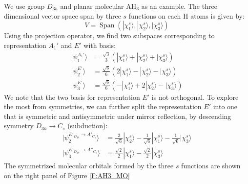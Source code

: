 \documentclass{article}
\DeclareMathOperator{\spn}{Span}
\begin{document}
We use group $D_{3h}$ and planar molecular AH$_3$ as an example. The 
three dimensional vector space span by three $s$ functions on each H atoms
is given by:
\begin{equation}
    V = \spn(|\chi^s_{1}\rangle, |\chi^s_2\rangle, |\chi^s_3\rangle)
\end{equation}
Using the projection operator, we find two subspaces corresponding to representation $A_1'$ 
and $E'$ with basis:
\begin{align}
    | \psi_1^{A_1'} \rangle &= \frac{\sqrt{3}}{3} (|\chi^s_1\rangle + |\chi^s_2\rangle + |\chi^s_3\rangle) \\
    |\psi_2^{E'}\rangle   &= \frac{\sqrt{6}}{6}( 2|\chi^s_1\rangle - |\chi^s_2\rangle - |\chi^s_3\rangle) \\
    |\psi_3^{E'}\rangle   &= \frac{\sqrt{6}}{6}(- |\chi^s_1\rangle + 2|\chi^s_2\rangle - |\chi^s_3\rangle)
\end{align}
We note that the two basis for representation $E'$ is not orthogonal.
To explore the most from symmetries, we can further split the representation $E'$ into one
that is symmetric and antisymmetric under mirror reflection, by descending symmetry $D_{3h}\to C_s$ (subduction):
\begin{align}
    |\psi_2^{E'_{D_{3h}}\to A'_{C_s}} \rangle &= \frac{2}{\sqrt{6}} |\chi^s_2\rangle - \frac{1}{\sqrt{6}} |\chi^s_1\rangle - \frac{1}{\sqrt{6}} |\chi^s_3\rangle \\
    |\psi_3^{E'_{D_{3h}}\to A''_{C_s}}\rangle &= \frac{\sqrt{2}}{2} |\chi^s_1\rangle - \frac{\sqrt{2}}{2} |\chi^s_3\rangle
\end{align}
The symmetrized molecular orbitals formed by the three $s$ functions are shown on the right panel of Figure \ref{F:AH3_MO}
\end{document}
